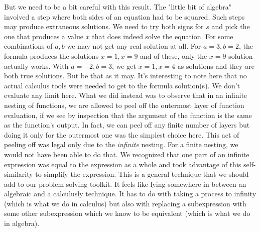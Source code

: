 But we need to be a bit careful with this result. The "little bit of algebra" involved a step where both sides of an equation had to be squared. Such steps may produce extraneous solutions. We need to try both signs for $s$ and pick the one that produces a value $x$ that does indeed solve the equation. For some combinations of $a,b$ we may not get any real solution at all. For $a = 3, b = 2$, the formula produces the solutions $x = 1, x = 9$ and of these, only the $x=9$ solution actually works. With $a = -2, b = 3$, we get $x = 1, x = 4$ as solutions and they are both true solutions. But be that as it may. It's interesting to note here that no actual calculus tools were needed to get to the formula solution(s). We don't evaluate any limit here. What we did instead was to observe that in an infinite nesting of functions, we are allowed to peel off the outermost layer of function evaluation, if we see by inspection that the argument of the function is the same as the function's output. In fact, we can peel off any finite number of layers but doing it only for the outermost one was the simplest choice here. This act of peeling off was legal only due to the \emph{infinite} nesting. For a finite nesting, we would not have been able to do that. We recognized that one part of an infinite expression was equal to the expression as a whole and took advantage of this self-similarity to simplify the expression. This is a general technique that we should add to our problem solving toolkit. It feels like lying somewhere in between an algebraic and a calculusly technique. It has to do with taking a process to infinity (which is what we do in calculus) but also with replacing a subexpression with some other subexpression which we know to be equivalent (which is what we do in algebra).





